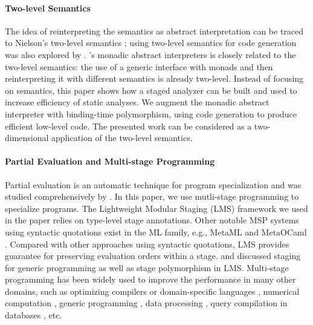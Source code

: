 \paragraph{Two-level Semantics} The idea of reinterpreting the semantics as
abstract interpretation can be traced to Nielson's two-level semantics
\cite{NIELSON1989117}; using two-level semantics for code generation
was also explored by \citet{NIELSON198859}.
\citet{Sergey:2013:MAI:2491956.2491979}'s monadic abstract
interpreters is closely related to the two-level semantics: the
use of a generic interface with monads and then reinterpreting it with
different semantics is already two-level. Instead of focusing on
semantics, this paper shows how a staged analyzer can be built and
used to increase efficiency of static analyses. We augment the monadic
abstract interpreter with binding-time polymorphism, using code generation to
produce efficient low-level code. The presented work can be considered as
a two-dimensional application of the two-level semantics.

\paragraph{Partial Evaluation and Multi-stage Programming}
Partial evaluation is an automatic technique for program
specialization and was studied comprehensively by
\citet{10.1007/3-540-61580-6_11, DBLP:books/daglib/0072559}.
In this paper, we use mutli-stage programming to specialize programs.
The Lightweight Modular Staging (LMS) framework
\cite{DBLP:conf/gpce/RompfO10} we used in the paper relies on
type-level stage annotations.  Other notable MSP systems using syntactic
quotations exist in the ML family, e.g., MetaML \cite{DBLP:conf/pepm/TahaS97}
and MetaOCaml \cite{DBLP:conf/gpce/CalcagnoTHL03, DBLP:conf/flops/Kiselyov14}. 
Compared with other approaches using syntactic quotations, LMS provides
guarantee for preserving evaluation orders within a stage.
\citet{Ofenbeck:2017:SGP:3136040.3136060} and
\citet{Amin:2017:CTI:3177123.3158140} discussed staging for generic programming
as well as stage polymorphism in LMS.
Multi-stage programming has been widely used to improve the
performance in many other domains, such as optimizing compilers or
domain-specific languages \cite{DBLP:conf/pldi/RompfSBLCO14,
  DBLP:conf/snapl/RompfBLSJAOSKDK15,
  DBLP:journals/tecs/SujeethBLRCOO14, DBLP:conf/gpce/SujeethGBLROO13,
  DBLP:journals/jfp/CaretteKS09}, numerical computation \cite{PGL-038,
  DBLP:conf/pepm/AktemurKKS13}, generic programming
\cite{DBLP:journals/pacmpl/Yallop17,
  Ofenbeck:2017:SGP:3136040.3136060}, data processing
\cite{DBLP:conf/oopsla/JonnalageddaCSRO14,
  DBLP:conf/popl/KiselyovBPS17}, query compilation in databases
\cite{DBLP:conf/osdi/EssertelTDBOR18, DBLP:conf/sigmod/TahboubER18},
etc.

